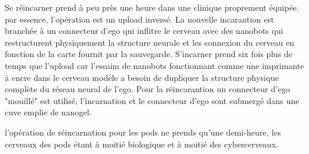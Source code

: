 Se réincarner prend à peu près une heure dans une clinique proprement équipée. par essence, l'opération est un upload inversé. La nouvelle incarantion est branchée à un connecteur d'ego qui inflitre le cerveau avec des nanobots qui restructurent physiquement la structure neurale et les connexion du cerveau en fonction de la carte fournit par la sauvegarde. S'incarner prend six fois plus de temps que l'upload car l'essaim de nanobots fonctionnant comme une imprimante à encre dans le cerveau modèle a besoin de dupliquer la structure physique complète du réseau neural de l'ego. Pour la réincarantion un connecteur d'ego "mouillé"  est utilisé, l'incarnation et le connecteur d'ego sont submergé dans une cuve emplie de nanogel. 

l'opération de réincarnation pour les pods ne prends qu'une demi-heure, les cerveaux des pods étant à moitié biologique et à moitié des cybercerveaux. 

